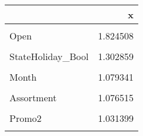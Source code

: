 \documentclass[border=1mm]{standalone}
\begin{document}
\begin{table}
\centering
\begin{tabular}{l|r}
\hline
  & x\\
\hline
\cellcolor{gray!10}{DayOfWeek} & \cellcolor{gray!10}{1.673502}\\
\hline
Open & 1.824508\\
\hline
\cellcolor{gray!10}{Promo} & \cellcolor{gray!10}{1.198975}\\
\hline
StateHoliday\_Bool & 1.302859\\
\hline
\cellcolor{gray!10}{Year} & \cellcolor{gray!10}{1.079118}\\
\hline
Month & 1.079341\\
\hline
\cellcolor{gray!10}{StoreType} & \cellcolor{gray!10}{1.070269}\\
\hline
Assortment & 1.076515\\
\hline
\cellcolor{gray!10}{CompetitionDistance} & \cellcolor{gray!10}{1.047493}\\
\hline
Promo2 & 1.031399\\
\hline
\cellcolor{gray!10}{Store} & \cellcolor{gray!10}{1.001303}\\
\hline
\end{tabular}
\end{table}
\end{document}
